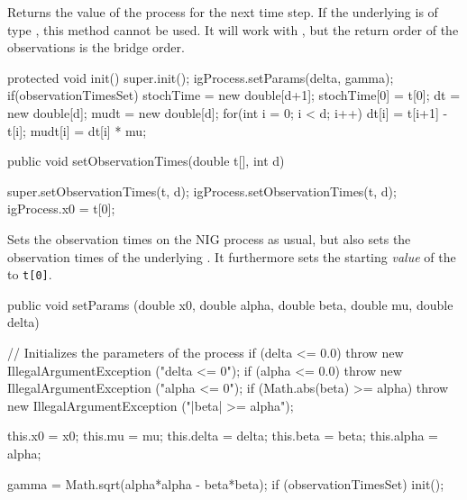 \begin{tabb} 
Returns the value of the process for the next time step.
If the underlying 
is of type , this method cannot be
used.  It will work with , but
the return order of the observations is the bridge order.
\end{tabb}
\begin{code}\begin{hide}

    protected void init()
    {
        super.init();
        igProcess.setParams(delta, gamma);
        if(observationTimesSet){
            stochTime = new double[d+1];
            stochTime[0] = t[0];
            dt = new double[d];
            mudt = new double[d];
            for(int i = 0; i < d; i++){
               dt[i]   = t[i+1] - t[i];
               mudt[i] = dt[i] * mu;
            }
        }
    }\end{hide}

   public void setObservationTimes(double t[], int d) \begin{hide} {
        super.setObservationTimes(t, d);
        igProcess.setObservationTimes(t, d);
        igProcess.x0 = t[0];
    }\end{hide}
\end{code}
\begin{tabb} Sets the observation times on the NIG process as usual,
but also sets the observation times of the underlying .
It furthermore sets the starting \emph{value} of the 
to \texttt{t[0]}.
\end{tabb}
\begin{code}

   public void setParams (double x0, double alpha, double beta,
                          double mu, double delta) \begin{hide} {
        // Initializes the parameters of the process
        if (delta <= 0.0)
            throw new IllegalArgumentException ("delta <= 0");
        if (alpha <= 0.0)
            throw new IllegalArgumentException ("alpha <= 0");
        if (Math.abs(beta) >= alpha)
            throw new IllegalArgumentException ("|beta| >= alpha");

        this.x0    = x0;
        this.mu    = mu;
        this.delta = delta;
        this.beta  = beta;
        this.alpha = alpha;

        gamma = Math.sqrt(alpha*alpha - beta*beta);
        if (observationTimesSet) init();
    }\end{hide}
\end{code}
